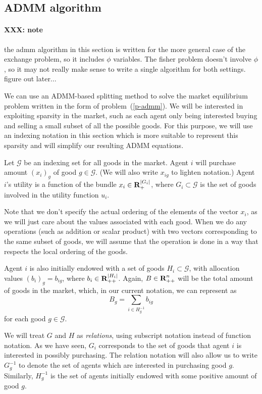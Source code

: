 \documentclass[12pt]{article}
\begin{document}
\subsection{ADMM algorithm}
\paragraph{XXX: note}
the admm algorithm in this section is written for the more general case of 
the exchange problem, so it includes $\phi$ variables.
The fisher problem doesn't involve $\phi$, so it may not really make sense
to write a single algorithm for both settings. figure out later...

We can use an ADMM-based splitting method \cite{boyd2011distributed} to
solve the market equilibrium problem written in the form of
problem~(\ref{p-admm}).
We will be interested in exploiting sparsity in the market, such
as each agent only being interested buying and selling a small subset 
of all the possible goods.
For this purpose, we will use an indexing notation in this section which is
more suitable to represent this sparsity and will simplify our resulting
ADMM equations.

Let $\mathcal{G}$ be an indexing set for all goods
in the market.
Agent $i$ will purchase amount $(x_i)_g$ of good $g \in \mathcal{G}$.
(We will also write $x_{ig}$ to lighten notation.)
Agent $i$'s utility is a function of the bundle $x_i \in {\mbox{\bf R}}_{+}^{|G_i|}$,
where $G_i \subset \mathcal{G}$ is the set of goods involved in the utility
function $u_i$.

Note that we don't specify the actual ordering of the elements
of the vector $x_i$, as we will just care about the values associated with
each good.
When we do any operations (such as addition or scalar product) with
two vectors corresponding to the same subset of goods, we will
assume that the operation is done in a way that respects the local ordering of
the goods.

Agent $i$ is also initially endowed with a set of goods
$H_i \subset \mathcal{G}$,
with allocation values $(b_i)_g = b_{ig}$, where $b_i \in {\mbox{\bf R}}_{++}^{|H_i|}$.
Again, $B \in {\mbox{\bf R}}^n_{++}$ will be the total amount of goods in the market, which, in our
current notation, we can represent as
\[
B_g = \sum\limits_{i \in H^{-1}_g} b_{ig}
\]
for each good $g \in \mathcal{G}$.

We will treat $G$ and $H$ as \emph{relations},
using subscript notation instead of function notation.
As we have seen, $G_i$ corresponds to the set of goods that agent $i$ is
interested
in possibly purchasing.
The relation notation will also allow us to
write $G^{-1}_g$ to denote the set of agents which are interested in
purchasing good $g$.
Similarly, $H^{-1}_g$ is the set of agents initially endowed with some
positive amount of good $g$.
\end{document}
